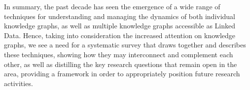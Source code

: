 \documentclass[sw]{iosart2x}
\begin{document}
















In summary, the past decade has seen the emergence of a wide range of techniques for understanding and managing the dynamics of both individual knowledge graphs, as well as multiple knowledge graphs accessible as Linked Data. Hence, taking into consideration the increased attention on knowledge graphs, we see a need for a systematic survey that draws together and describes these techniques, showing how they may interconnect and complement each other, as well as distilling the key research questions that remain open in the area, providing a framework in order to appropriately position future research activities.
\end{document}
